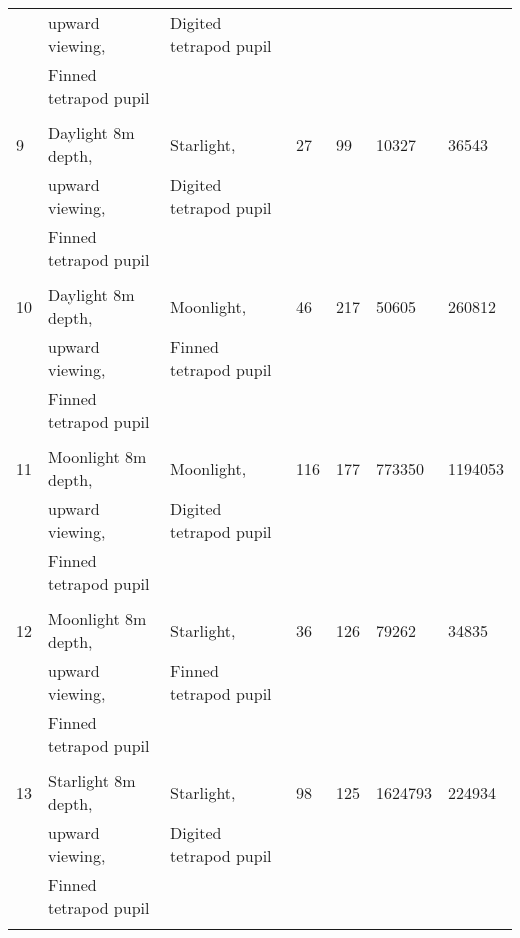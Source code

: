 \begin{tabular}{lllllll}
&upward viewing,&Digited tetrapod pupil&&&&\\\
&Finned tetrapod pupil&&&&&\\\\\hline
9&Daylight 8m depth,&Starlight,&27&99&10327&36543\\\
&upward viewing,&Digited tetrapod pupil&&&&\\\
&Finned tetrapod pupil&&&&&\\\\\hline
10&Daylight 8m depth,&Moonlight,&46&217&50605&260812\\\
&upward viewing,&Finned tetrapod pupil&&&&\\\
&Finned tetrapod pupil&&&&&\\\\\hline
11&Moonlight 8m depth,&Moonlight,&116&177&773350&1194053\\\
&upward viewing,&Digited tetrapod pupil&&&&\\\
&Finned tetrapod pupil&&&&&\\\\\hline
12&Moonlight 8m depth,&Starlight,&36&126&79262&34835\\\
&upward viewing,&Finned tetrapod pupil&&&&\\\
&Finned tetrapod pupil&&&&&\\\\\hline
13&Starlight 8m depth,&Starlight,&98&125&1624793&224934\\\
&upward viewing,&Digited tetrapod pupil&&&&\\\
&Finned tetrapod pupil&&&&&\\\\\hline
\bottomrule
\end{tabular}
